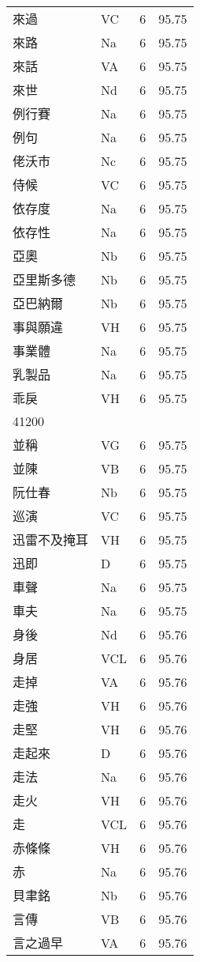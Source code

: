 \documentclass[twocolumn]{book}
\begin{document}
\begin{supertabular}{llrr}
來過 & VC & 6 &  95.75\\
來路 & Na & 6 &  95.75\\
來話 & VA & 6 &  95.75\\
來世 & Nd & 6 &  95.75\\
例行賽 & Na & 6 &  95.75\\
例句 & Na & 6 &  95.75\\
佬沃市 & Nc & 6 &  95.75\\
侍候 & VC & 6 &  95.75\\
依存度 & Na & 6 &  95.75\\
依存性 & Na & 6 &  95.75\\
亞奧 & Nb & 6 &  95.75\\
亞里斯多德 & Nb & 6 &  95.75\\
亞巴納爾 & Nb & 6 &  95.75\\
事與願違 & VH & 6 &  95.75\\
事業體 & Na & 6 &  95.75\\
乳製品 & Na & 6 &  95.75\\
乖戾 & VH & 6 &  95.75\\
41200\\
並稱 & VG & 6 &  95.75\\
並陳 & VB & 6 &  95.75\\
阮仕春 & Nb & 6 &  95.75\\
巡演 & VC & 6 &  95.75\\
迅雷不及掩耳 & VH & 6 &  95.75\\
迅即 & D & 6 &  95.75\\
車聲 & Na & 6 &  95.75\\
車夫 & Na & 6 &  95.75\\
身後 & Nd & 6 &  95.76\\
身居 & VCL & 6 &  95.76\\
走掉 & VA & 6 &  95.76\\
走強 & VH & 6 &  95.76\\
走堅 & VH & 6 &  95.76\\
走起來 & D & 6 &  95.76\\
走法 & Na & 6 &  95.76\\
走火 & VH & 6 &  95.76\\
走 & VCL & 6 &  95.76\\
赤條條 & VH & 6 &  95.76\\
赤 & Na & 6 &  95.76\\
貝聿銘 & Nb & 6 &  95.76\\
言傳 & VB & 6 &  95.76\\
言之過早 & VA & 6 &  95.76\\

\end{supertabular}
\end{document}
